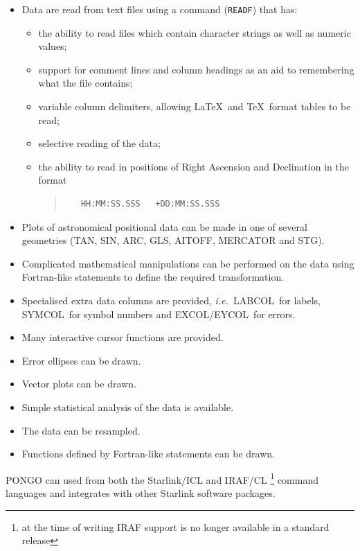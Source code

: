 \documentclass[twoside,11pt]{article}
\newcommand{\htmlref}[2]{#1}
\renewcommand{\_}{\texttt{\symbol{95}}}
\newcommand{\ie}{{\em i.e.\ }}
\newcommand{\excol}{{\sf EXCOL}}
\newcommand{\eycol}{{\sf EYCOL}}
\newcommand{\symcol}{{\sf SYMCOL}}
\newcommand{\labcol}{{\sf LABCOL}}
\newcommand{\cnam}[1]{{\tt #1}}
\newcommand{\iref} [1]{\htmlref{#1}{#1}}
\begin{document}
\begin{itemize}
\item Data are read from text files using a command (\cnam{\iref{READF}})
  that has:
  \begin{itemize}
  \item the ability to read files which contain character strings as well as
    numeric values;
  \item support for comment lines and column headings as an aid to remembering
    what the file contains;
  \item variable column delimiters, allowing \LaTeX\ and \TeX\
    format tables to be read;
  \item selective reading of the data;
  \item the ability to read in positions of Right Ascension and
    Declination in the format
    \begin{quote}
\begin{verbatim}
   HH:MM:SS.SSS   +DD:MM:SS.SSS
\end{verbatim}
    \end{quote}
  \end{itemize}
\item Plots of astronomical positional data can be made in one of several
  geometries (TAN, SIN, ARC, GLS, AITOFF, MERCATOR and STG).

\item Complicated mathematical manipulations can be performed on the data
  using  Fortran-like statements to define the required transformation.
\item Specialised extra data columns are provided, \ie \labcol\ for
  labels, \symcol\ for symbol numbers and \excol/\eycol\ for errors.
\item Many interactive cursor functions are provided.
\item Error ellipses can be drawn.
\item Vector plots can be drawn.
\item Simple statistical analysis of the data is available.
\item The data can be resampled.
\item Functions defined by Fortran-like statements can be drawn.
\end{itemize}

PONGO can used from both the Starlink/ICL and IRAF/CL
\footnote{at the time of writing IRAF support is no longer available
in a standard release} command languages and integrates with other Starlink
software packages.
\end{document}
